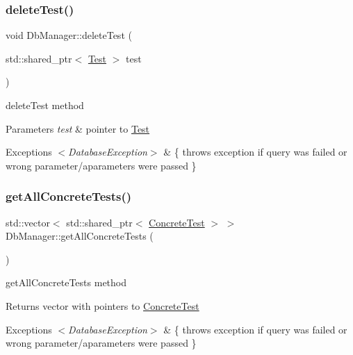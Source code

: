 \subsubsection{\texorpdfstring{delete\+Test()}{deleteTest()}}
{\footnotesize\ttfamily void Db\+Manager\+::delete\+Test (\begin{DoxyParamCaption}\item[{std\+::shared\+\_\+ptr$<$ \hyperlink{class_test}{Test} $>$}]{test }\end{DoxyParamCaption})}



delete\+Test method 


\begin{DoxyParams}{Parameters}
{\em test} & pointer to \hyperlink{class_test}{Test} \\
\hline
\end{DoxyParams}

\begin{DoxyExceptions}{Exceptions}
{\em $<$\+Database\+Exception$>$} & \{ throws exception if query was failed or wrong parameter/aparameters were passed \} \\
\hline
\end{DoxyExceptions}
\mbox{\label{class_db_manager_a78e619d59729619e3faaca7335b736c0}} 
\subsubsection{\texorpdfstring{get\+All\+Concrete\+Tests()}{getAllConcreteTests()}}
{\footnotesize\ttfamily std\+::vector$<$ std\+::shared\+\_\+ptr$<$ \hyperlink{class_concrete_test}{Concrete\+Test} $>$ $>$ Db\+Manager\+::get\+All\+Concrete\+Tests (\begin{DoxyParamCaption}{ }\end{DoxyParamCaption})}



get\+All\+Concrete\+Tests method 

\begin{DoxyReturn}{Returns}
vector with pointers to \hyperlink{class_concrete_test}{Concrete\+Test} 
\end{DoxyReturn}

\begin{DoxyExceptions}{Exceptions}
{\em $<$\+Database\+Exception$>$} & \{ throws exception if query was failed or wrong parameter/aparameters were passed \} \\
\hline
\end{DoxyExceptions}
\mbox{\label{class_db_manager_a1b47ae876255a8aaee2d0cced76c83ab}} 
